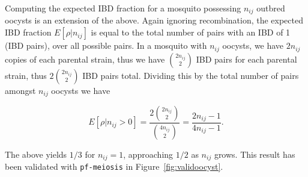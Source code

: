 \documentclass[9pt]{article}
\begin{document}
Computing the expected IBD fraction for a mosquito possessing $n_{ij}$ outbred oocysts is an extension of the above. Again ignoring recombination, the expected IBD fraction $E[\rho|n_{ij}]$ is equal to the total number of pairs with an IBD of 1 (IBD pairs), over all possible pairs. In a mosquito with $n_{ij}$ oocysts, we have $2n_{ij}$ copies of each parental strain, thus we have ${2n_{ij} \choose 2}$ IBD pairs for each parental strain, thus $2 {2n_{ij} \choose 2}$ IBD pairs total. Dividing this by the total number of pairs amongst $n_{ij}$ oocysts we have

\begin{equation} \label{eq1}
E[\rho|n_{ij} > 0] = \frac{2{2n_{ij} \choose 2}}{{4n_{ij} \choose 2}} = \frac{2n_{ij} - 1}{4n_{ij} - 1}.
\end{equation}

The above yields $1/3$ for $n_{ij}=1$, approaching $1/2$ as $n_{ij}$ grows. This result has been validated with \texttt{pf-meiosis} in Figure~\ref{fig:validoocyst}.
\end{document}

